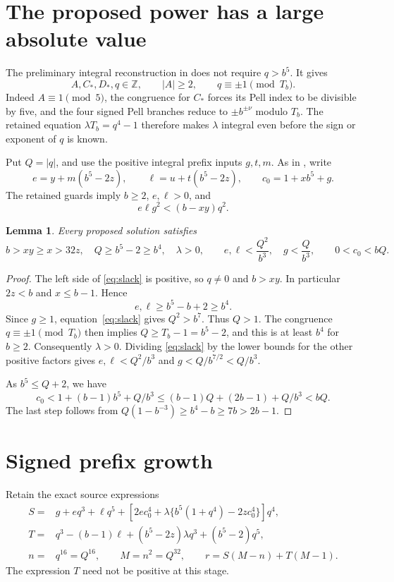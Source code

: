 \documentclass[11pt]{article}
\newtheorem{lemma}[theorem]{Lemma}
\newcommand{\Z}{\mathbb Z}\newcommand{\Q}{\mathbb Q}
\begin{document}
\section{The proposed power has a large absolute value}

The preliminary integral reconstruction in \cite{Power} does not
require \(q>b^5\). It gives
\[
 A,C_*,D_*,q\in\Z,\qquad |A|\ge2,\qquad
 q\equiv\pm1\pmod{T_b}.
\]
Indeed \(A\equiv1\pmod5\), the congruence for \(C_*\) forces its
Pell index to be divisible by five, and the four signed Pell branches
reduce to \(\pm b^{\pm\nu}\) modulo \(T_b\).
The retained equation \(\lambda T_b=q^4-1\) therefore makes
\(\lambda\) integral even before the sign or exponent of \(q\)
is known.

Put \(Q=|q|\), and use the positive integral prefix inputs \(g,t,m\).
As in \cite{Power}, write
\[
 e=y+m(b^5-2z),\qquad
 \ell=u+t(b^5-2z),\qquad c_0=1+xb^5+g.
\]
The retained guards imply \(b\ge2\), \(e,\ell>0\), and
\begin{equation}\label{eq:slack}
                    e\ell g^2<(b-xy)q^2.
\end{equation}

\begin{lemma}\label{lem:large-Q}
Every proposed solution satisfies
\[
 b>xy\ge x>32z,\quad Q\ge b^5-2\ge b^4,\quad \lambda>0,
 \qquad e,\ell<\frac{Q^2}{b^3},\quad g<\frac{Q}{b^3},
 \qquad 0<c_0<bQ.
\]
\end{lemma}
\begin{proof}
The left side of \eqref{eq:slack} is positive, so \(q\ne0\) and
\(b>xy\). In particular \(2z<b\) and \(x\le b-1\). Hence
\[
             e,\ell\ge b^5-b+2\ge b^4.
\]
Since \(g\ge1\), equation~\eqref{eq:slack} gives \(Q^2>b^7\).
Thus \(Q>1\). The congruence \(q\equiv\pm1\pmod{T_b}\)
then implies \(Q\ge T_b-1=b^5-2\), and this is at least
\(b^4\) for \(b\ge2\). Consequently \(\lambda>0\).
Dividing \eqref{eq:slack} by the lower bounds for the other
positive factors gives \(e,\ell<Q^2/b^3\) and
\(g<Q/b^{7/2}<Q/b^3\).

As \(b^5\le Q+2\), we have
\[
 c_0<1+(b-1)b^5+Q/b^3
       \le(b-1)Q+(2b-1)+Q/b^3<bQ.
\]
The last step follows from
\(Q(1-b^{-3})\ge b^4-b\ge7b>2b-1\).
\end{proof}

\section{Signed prefix growth}

Retain the exact source expressions
\begin{align*}
 S={}&g+eq^3+\ell q^5+
   \left[2ec_0^4+\lambda\{b^5(1+q^4)-2zc_0^4\}\right]q^4,\\
 T={}&q^3-(b-1)\ell+(b^5-2z)\lambda q^3+(b^5-2)q^5,\\
 n={}&q^{16}=Q^{16},\qquad M=n^2=Q^{32},\qquad
 r=S(M-n)+T(M-1).
\end{align*}
The expression \(T\) need not be positive at this stage.
\end{document}
